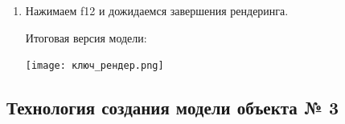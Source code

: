 \documentclass[12pt]{article}
\begin{document}
\begin{enumerate}
\item Нажимаем f12 и дожидаемся завершения рендеринга.



Итоговая версия модели:


\vskip 1cm
{
    \centering
    \texttt{[image: ключ\_рендер.png]}
    \label{fig:i1}
}
\vskip 1cm



\end{enumerate} 
    
    
    
    
    
    
    
    
    
    
    
    
    
    
    
    
    
    
    
    
    




\subsection{Технология создания модели объекта № 3}
\end{document}
